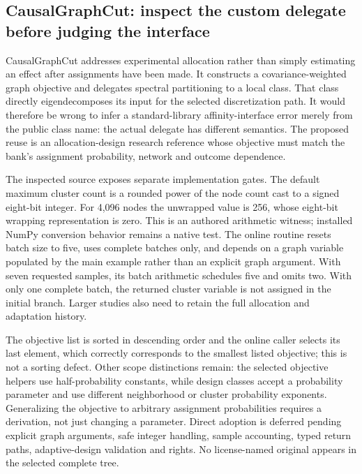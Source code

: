 \subsection{CausalGraphCut: inspect the custom delegate before judging the interface}

CausalGraphCut addresses experimental allocation rather than simply estimating an effect after assignments have been made. It constructs a covariance-weighted graph objective and delegates spectral partitioning to a local class. That class directly eigendecomposes its input for the selected discretization path. It would therefore be wrong to infer a standard-library affinity-interface error merely from the public class name: the actual delegate has different semantics. The proposed reuse is an allocation-design research reference whose objective must match the bank's assignment probability, network and outcome dependence.\citep{exec25_pnet_cut}

The inspected source exposes separate implementation gates. The default maximum cluster count is a rounded power of the node count cast to a signed eight-bit integer. For 4,096 nodes the unwrapped value is 256, whose eight-bit wrapping representation is zero. This is an authored arithmetic witness; installed NumPy conversion behavior remains a native test. The online routine resets batch size to five, uses complete batches only, and depends on a graph variable populated by the main example rather than an explicit graph argument. With seven requested samples, its batch arithmetic schedules five and omits two. With only one complete batch, the returned cluster variable is not assigned in the initial branch. Larger studies also need to retain the full allocation and adaptation history.\citep{exec25_pnet_cut,exec25_pnet_choice}

The objective list is sorted in descending order and the online caller selects its last element, which correctly corresponds to the smallest listed objective; this is not a sorting defect. Other scope distinctions remain: the selected objective helpers use half-probability constants, while design classes accept a probability parameter and use different neighborhood or cluster probability exponents. Generalizing the objective to arbitrary assignment probabilities requires a derivation, not just changing a parameter. Direct adoption is deferred pending explicit graph arguments, safe integer handling, sample accounting, typed return paths, adaptive-design validation and rights. No license-named original appears in the selected complete tree.\citep{exec25_pnet_cut,exec25_pnet_choice}


